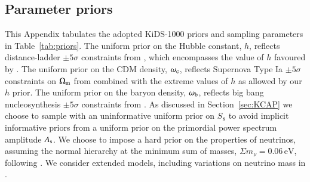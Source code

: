 \begin{appendix}
\section{Parameter priors}
\label{app:priors}
This Appendix tabulates the adopted KiDS-1000 priors and sampling parameters in Table~\ref{tab:priors}.   
The uniform prior on the Hubble constant, $h$, reflects distance-ladder $\pm 5 \sigma$ constraints from \citet{riess/etal:2016}, which encompasses the value of $h$ favoured by \citet{planck/etal:2018}.  
The uniform prior on the CDM density, $\omega_{\rm c}$, reflects Supernova Type Ia $\pm 5 \sigma$ constraints on $\Omega_{\rm m}$ from \citet{scolnic/etal:2018} combined with the extreme values of $h$ as allowed by our $h$ prior.   
The uniform prior on the baryon density, $\omega_{\rm b}$, reflects big bang nucleosynthesis $\pm 5 \sigma$ constraints from \citet{olive/etal:2014}.   
As discussed in Section~\ref{sec:KCAP} we choose to sample with an uninformative uniform prior on $S_8$ to avoid implicit informative priors from a uniform prior on the primordial power spectrum amplitude $A_{\rm s}$.    
We choose to impose a hard prior on the properties of neutrinos, assuming the normal hierarchy at the minimum sum of masses, $\Sigma m_\nu = 0.06\,\mathrm{eV}$, following \citet{planck/etal:2018}.  
We consider extended models, including variations on neutrino mass in \citet{troester/etal:inprep}.


\end{appendix}
